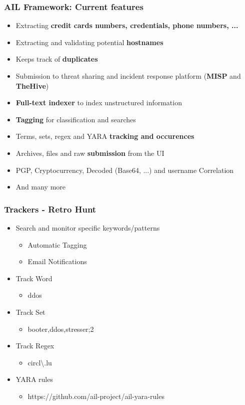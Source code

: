 \documentclass{beamer}
\begin{document}
\begin{frame}
    \frametitle{AIL Framework: Current features}
    \begin{itemize}
        \item Extracting \textbf{credit cards numbers, credentials, phone numbers, ...}
        \item Extracting and validating potential \textbf{hostnames}
        \item Keeps track of \textbf{duplicates}
        \item Submission to threat sharing and incident response platform (\textbf{MISP} and \textbf{TheHive})
        \item \textbf{Full-text indexer} to index unstructured information
        \item \textbf{Tagging} for classification and searches
        \item Terms, sets, regex and YARA \textbf{tracking and occurences}
        \item Archives, files and raw \textbf{submission} from the UI
        \item PGP, Cryptocurrency, Decoded (Base64, ...) and username Correlation
        \item And many more
    \end{itemize}
\end{frame}


\begin{frame}
    \frametitle{Trackers - Retro Hunt}
        \begin{itemize}
        	\item Search and monitor specific keywords/patterns
        	\begin{itemize}
            	\item Automatic Tagging
            	\item Email Notifications
            \end{itemize}
            \item Track Word
            \begin{itemize}
            	\item ddos
            \end{itemize}
            \item Track Set
            \begin{itemize}
            	\item booter,ddos,stresser;2
            \end{itemize}
            \item Track Regex
            \begin{itemize}
            	\item circl\textbackslash.lu
            \end{itemize}
            \item YARA rules
            	\begin{itemize}
            	\item https://github.com/ail-project/ail-yara-rules
            \end{itemize}
        \end{itemize}
\end{frame}
\end{document}
